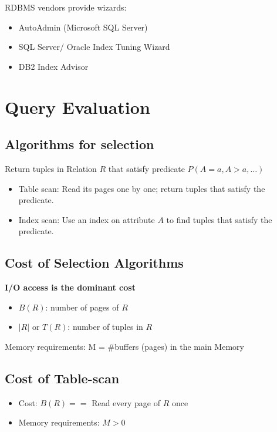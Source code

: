 \documentclass[12pt,a4paper]{article}
\begin{document}
RDBMS vendors provide wizards:

\begin{itemize}
    \item AutoAdmin (Microsoft SQL Server)
    \item SQL Server/ Oracle Index Tuning Wizard
    \item DB2 Index Advisor
\end{itemize}

\section*{Query Evaluation}

\subsection*{Algorithms for selection}

Return tuples in Relation $R$ that satisfy predicate $P(A = a, A > a, \dots)$

\begin{itemize}
    \item Table scan: Read its pages one by one; return tuples that satisfy the predicate.
    \item Index scan: Use an index on attribute $A$ to find tuples that satisfy the predicate.
\end{itemize}

\subsection*{Cost of Selection Algorithms}

\textbf{I/O access is the dominant cost}

\begin{itemize}
    \item $B(R)$: number of pages of $R$
    \item $ \lvert R \rvert$ or $T(R)$: number of tuples in $R$
\end{itemize}

Memory requirements: M = \#buffers (pages) in the main Memory

\subsection*{Cost of Table-scan}

\begin{itemize}
    \item Cost: $B(R) ==$ Read every page of $R$ once
    \item Memory requirements: $M > 0$
\end{itemize}
\end{document}
